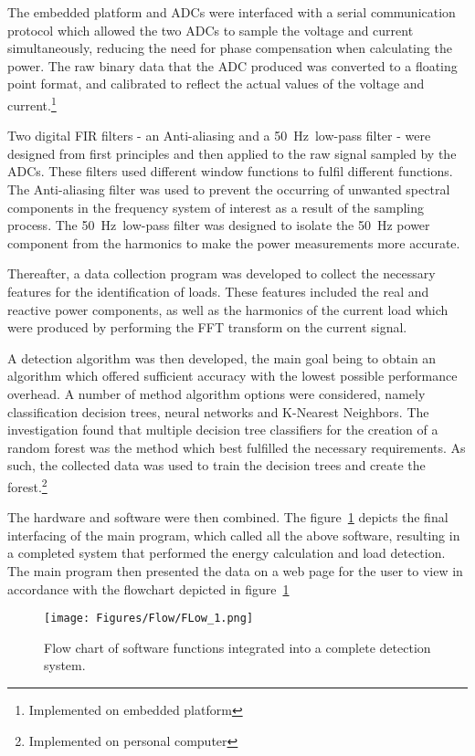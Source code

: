 \par
The embedded platform and ADCs were interfaced with a serial communication protocol which allowed the two ADCs to sample the voltage and current simultaneously, reducing the need for phase compensation when calculating the power. The raw binary data that the ADC produced was converted to a floating point format, and calibrated to reflect the actual values of the voltage and current.\footnote[1]{Implemented on embedded platform} 
\par
Two digital FIR filters - an Anti-aliasing and a \qty{50}{\hertz}~low-pass filter - were designed from first principles and then applied to the raw signal sampled by the ADCs. These filters used different window functions to fulfil different functions. The Anti-aliasing filter was used to prevent the occurring of unwanted spectral components in the frequency system of interest as a result of the sampling process. The \qty{50}{\hertz}~low-pass filter was designed to isolate the \qty{50}{\hertz} power component from the harmonics to make the power measurements more accurate.\footnotemark[1]
\par
Thereafter, a data collection program was developed to collect the necessary features for the identification of loads. These features included the real and reactive power components, as well as the harmonics of the current load which were produced by performing the FFT transform on the current signal.
\par 
A detection algorithm was then developed, the main goal being to obtain an algorithm which offered sufficient accuracy with the lowest possible performance overhead. A number of method algorithm options were considered, namely classification decision trees, neural networks and K-Nearest Neighbors. The investigation found that multiple decision tree classifiers for the creation of a random forest was the method which best fulfilled the necessary requirements. As such, the collected data was used to train the decision trees and create the forest.\footnote[2]{Implemented on personal computer}
\par
The hardware and software were then combined. The figure~\ref{fig:Flow_1} depicts the final interfacing of the main program, which called all the above software, resulting in a completed system that performed the energy calculation and load detection. The main program then presented the data on a web page for the user to view in accordance with the flowchart depicted in figure~\ref{fig:Flow_1}

\begin{figure}[H]
    \centering
    \texttt{[image: Figures/Flow/FLow\_1.png]}
    \caption{Flow chart of software functions integrated into a complete detection system.}
    \label{fig:Flow_1}
\end{figure}


 
\newpage


